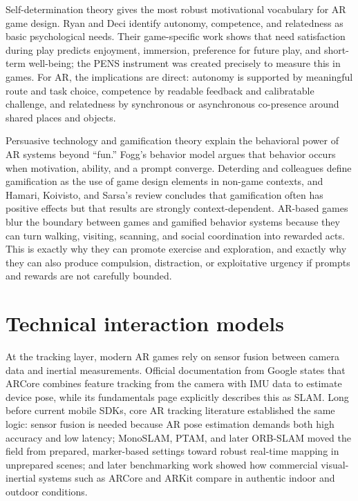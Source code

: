 \begin{sloppy}
Self-determination theory gives the most robust motivational vocabulary for AR game design. Ryan and Deci identify autonomy, competence, and relatedness as basic psychological needs. Their game-specific work shows that need satisfaction during play predicts enjoyment, immersion, preference for future play, and short-term well-being; the PENS instrument was created precisely to measure this in games. For AR, the implications are direct: autonomy is supported by meaningful route and task choice, competence by readable feedback and calibratable challenge, and relatedness by synchronous or asynchronous co-presence around shared places and objects.

Persuasive technology and gamification theory explain the behavioral power of AR systems beyond ``fun.'' Fogg's behavior model argues that behavior occurs when motivation, ability, and a prompt converge. Deterding and colleagues define gamification as the use of game design elements in non-game contexts, and Hamari, Koivisto, and Sarsa's review concludes that gamification often has positive effects but that results are strongly context-dependent. AR-based games blur the boundary between games and gamified behavior systems because they can turn walking, visiting, scanning, and social coordination into rewarded acts. This is exactly why they can promote exercise and exploration, and exactly why they can also produce compulsion, distraction, or exploitative urgency if prompts and rewards are not carefully bounded.

\section*{Technical interaction models}
At the tracking layer, modern AR games rely on sensor fusion between camera data and inertial measurements. Official documentation from Google states that ARCore combines feature tracking from the camera with IMU data to estimate device pose, while its fundamentals page explicitly describes this as SLAM. Long before current mobile SDKs, core AR tracking literature established the same logic: sensor fusion is needed because AR pose estimation demands both high accuracy and low latency; MonoSLAM, PTAM, and later ORB-SLAM moved the field from prepared, marker-based settings toward robust real-time mapping in unprepared scenes; and later benchmarking work showed how commercial visual-inertial systems such as ARCore and ARKit compare in authentic indoor and outdoor conditions.


\end{sloppy}
